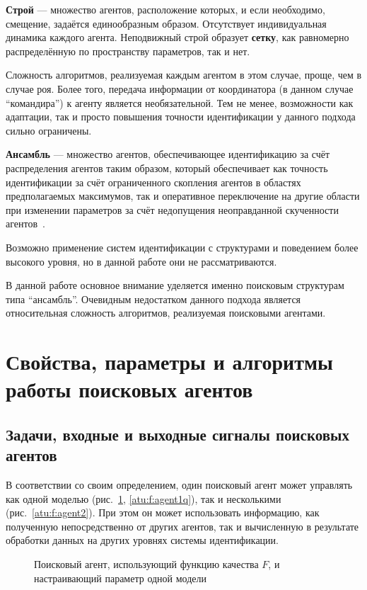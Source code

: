 \textbf{ Строй } --- множество агентов, расположение которых,
и если необходимо, смещение, задаётся
единообразным образом.
Отсутствует индивидуальная динамика каждого агента.
Неподвижный строй образует \textbf{сетку},
как равномерно распределённую по пространству параметров,
так и нет.

Сложность алгоритмов, реализуемая каждым агентом в этом случае,
проще, чем в случае роя. Более того, передача информации от
координатора (в данном случае ``командира'') к агенту
является необязательной.
Тем не менее, возможности как адаптации,
так и просто повышения точности идентификации
у данного подхода сильно ограничены.

\textbf{ Ансамбль } --- множество агентов, обеспечивающее идентификацию за счёт
распределения агентов таким образом, который обеспечивает как
точность идентификации за счёт ограниченного скопления агентов
в областях предполагаемых максимумов, так и оперативное переключение
на другие области при изменении параметров за счёт недопущения
неоправданной скученности агентов~\cite{atu_ric2016}.

Возможно применение систем идентификации с структурами и поведением более высокого уровня,
но в данной работе они не рассматриваются.

В данной работе основное внимание уделяется именно
поисковым структурам типа ``ансамбль''.
Очевидным недостатком данного подхода является
относительная сложность алгоритмов, реализуемая поисковыми агентами.



\section{Свойства, параметры и алгоритмы работы поисковых агентов}  %

\subsection{Задачи, входные и выходные сигналы поисковых агентов} %

В соответствии со своим определением,
один поисковый агент может управлять как одной моделью (рис.~\ref{atu:f:agent1}, \ref{atu:f:agent1q}),
так и несколькими (рис.~\ref{atu:f:agent2}).
При этом он может использовать информацию,
как полученную непосредственно от других агентов,
так и вычисленную в результате обработки данных на других уровнях системы идентификации.

\begin{figure}[htb!]
\begin{center}

\end{center}
\caption{Поисковый агент, использующий функцию качества $F$, и настраивающий параметр одной модели}
\label{atu:f:agent1}
\end{figure}


